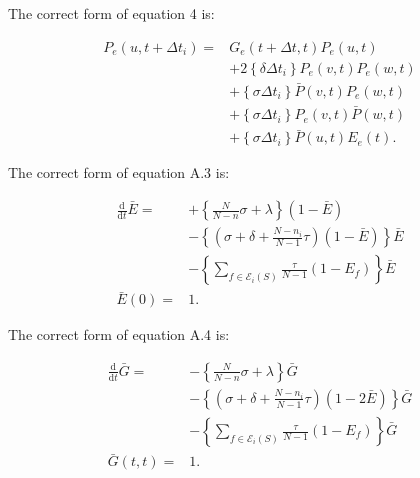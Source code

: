 \documentclass[preprint, 
superscriptaddress,aip,author-year]{revtex4-1}
\begin{document}
\renewcommand{\theequation}{A\arabic{equation}}
\addtocounter{equation}{+1}

The correct form of equation 4 is:

\begin{align}
 P_e (u,t+\Delta t_i) =& G_e (t+\Delta t,t ) P_e(u,t) \label{Pe}
 \nonumber \\
& +2 \left\{\delta \Delta t_i \right\} P_e(v,t) P_e(w,t) \nonumber \\
& +\left\{\sigma \Delta t_i \right\} \bar P(v,t) P_e(w,t)\nonumber \\
& +\left\{\sigma \Delta t_i \right\} P_e(v,t) \bar P(w,t)\nonumber \\
& +\left\{\sigma \Delta t_i \right\} \bar P(u,t) E_e(t). \nonumber 
\end{align}

The correct form of equation A.3 is:

\begin{align}
\frac{\mathrm{d}}{\mathrm{d} t} {\bar E} = &+\left\{ \frac{N}{N-n}
  \sigma + \lambda \right\} (1-\bar E ) \label{bare}  \nonumber\\
&- \left\{ ( \sigma + \delta + \frac{N-n_i}{N-1}\tau ) (1-\bar E ) \right\} \bar E \nonumber\\
& - \left\{ \sum_{f \in \mathcal{E}_i(S) } \frac{\tau}{N-1} (1-E_f) \right\}\bar E \nonumber\\
 \bar E(0)=&1. \nonumber 
 \end{align}

\addtocounter{equation}{+1}

The correct form of equation A.4 is:

\begin{align}
 \frac{\mathrm{d}}{\mathrm{d} t} \bar G = & - \left\{ \frac{N}{N-n}
   \sigma + \lambda \right\} \bar G \label{barg}  \nonumber\\ 
& - \left\{ (\sigma + \delta + \frac{N-n_i}{N-1}\tau) (1-2\bar E )\right\} \bar G \nonumber\\ 
& - \left\{ \sum_{f \in \mathcal{E}_i(S) } \frac{\tau}{N-1} (1-E_f) \right\} \bar G \nonumber \\ 
\bar G(t,t) = & 1. \nonumber 
\end{align}




 
\end{document}
